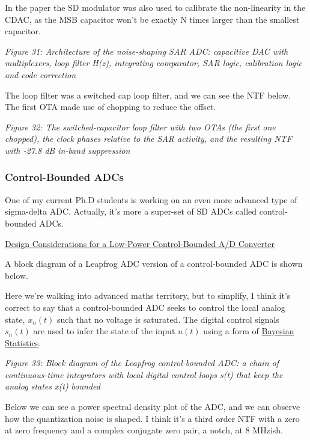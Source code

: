 In the paper the SD modulator was also used to calibrate the
non-linearity in the CDAC, as the MSB capacitor won't be exactly N times
larger than the smallest capacitor.


{
\centering
{}
}

\emph{Figure 31: Architecture of the noise-shaping SAR ADC: capacitive
DAC with multiplexers, loop filter H(z), integrating comparator, SAR
logic, calibration logic and code correction}

The loop filter was a switched cap loop filter, and we can see the NTF
below. The first OTA made use of chopping to reduce the offset.


{
\centering
{}
}

\emph{Figure 32: The switched-capacitor loop filter with two OTAs (the
first one chopped), the clock phases relative to the SAR activity, and
the resulting NTF with -27.8 dB in-band suppression}

\subsubsection{Control-Bounded ADCs}\label{control-bounded-adcs}

One of my current Ph.D students is working on an even more advanced type
of sigma-delta ADC. Actually, it's more a super-set of SD ADCs called
control-bounded ADCs.

\href{https://ntnuopen.ntnu.no/ntnu-xmlui/handle/11250/2824253}{Design
Considerations for a Low-Power Control-Bounded A/D Converter}

A block diagram of a Leapfrog ADC version of a control-bounded ADC is
shown below.

Here we're walking into advanced maths territory, but to simplify, I
think it's correct to say that a control-bounded ADC seeks to control
the local analog state, \(x_n(t)\) such that no voltage is saturated.
The digital control signals \(s_n(t)\) are used to infer the state of
the input \(u(t)\) using a form of
\href{https://en.wikipedia.org/wiki/Bayesian_statistics}{Bayesian
Statistics}.


{
\centering
{}
}

\emph{Figure 33: Block diagram of the Leapfrog control-bounded ADC: a
chain of continuous-time integrators with local digital control loops
s(t) that keep the analog states x(t) bounded}

Below we can see a power spectral density plot of the ADC, and we can
observe how the quantization noise is shaped. I think it's a third order
NTF with a zero at zero frequency and a complex conjugate zero pair, a
notch, at 8 MHzish.


